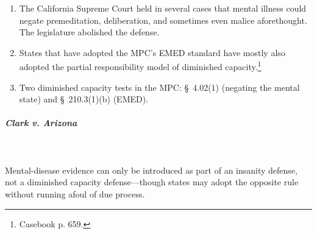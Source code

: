 \begin{enumerate}
\begin{enumerate}
        mental disease or defect is admissible whenever it is relevant to 
        prove that the defendant did or did not have a state of mind which is 
        an element of the offense.''
        \item Manslaughter, \S\ 210.3(1)(b): ``Homicide constitutes 
        manslaughter when: (b) a homicide that would otherwise be murder is 
        committed under the influence of \textbf{extreme mental or emotional}
        disturbance for which there is a reasonable explanation or excuse.''
        \item Can be used to negate the intent for \emph{any} crime---not just 
        specific intent crimes.
        \item Allows capital cases to be mitigated to imprisonment.
        \item Permits EMED, which is a variant of the partial responsibility 
        defense.
    \end{enumerate}
    \item The California Supreme Court held in several cases that mental 
    illness could negate premeditation, deliberation, and sometimes even 
    malice aforethought. The legislature abolished the defense.
    \item States that have adopted the MPC's EMED standard have mostly also 
    adopted the partial responsibility model of diminished 
    capacity.\footnote{Casebook p. 659.}
    \item Two diminished capacity tests in the MPC: \S\ 4.02(1) (negating the 
    mental state) and \S\ 210.3(1)(b) (EMED).
\end{enumerate}

\paragraph{\emph{Clark v. Arizona}}
~\\\\
Mental-disease evidence can only be introduced as part of an insanity defense, 
not a diminished capacity defense---though states may adopt the opposite rule 
without running afoul of due process.

